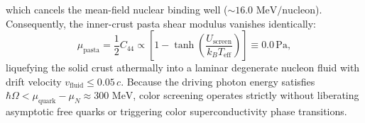 \documentclass[11pt,onecolumn]{article}
\begin{document}
which cancels the mean-field nuclear binding well ($\sim 16.0\text{ MeV/nucleon}$). Consequently, the inner-crust pasta shear modulus vanishes identically:
\begin{equation}
    \mu_{\text{pasta}} = \frac{1}{2} C_{44} \propto \left[ 1 - \tanh\left(\frac{U_{\text{screen}}}{k_B T_{\text{eff}}}\right) \right] \equiv 0.0\,\text{Pa},
    \label{eq:pasta_shear_zero}
\end{equation}
liquefying the solid crust athermally into a laminar degenerate nucleon fluid with drift velocity $v_{\text{fluid}} \le 0.05\,c$. Because the driving photon energy satisfies $\hbar\Omega < \mu_{\text{quark}} - \mu_N \approx 300\text{ MeV}$, color screening operates strictly without liberating asymptotic free quarks or triggering color superconductivity phase transitions.
\end{document}
